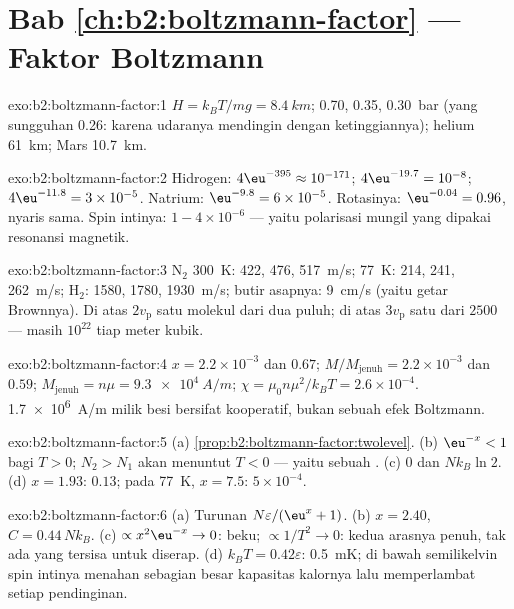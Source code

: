 \section*{Bab \ref{ch:b2:boltzmann-factor} --- Faktor Boltzmann}

\begin{solution}{exo:b2:boltzmann-factor:1}
$H = k_BT/mg = \qty{8.4}{km}$; \qty{0.70}{}, \qty{0.35}{}, \qty{0.30}{bar} (yang sungguhan
\qty{0.26}{}: karena udaranya mendingin dengan ketinggiannya); helium \qty{61}{km}; Mars
\qty{10.7}{km}.
\end{solution}

\begin{solution}{exo:b2:boltzmann-factor:2}
Hidrogen: $4\eu^{-395} \approx 10^{-171}$; $4\eu^{-19.7} = 10^{-8}$; $4\eu^{-11.8} = 3 \times
10^{-5}$. Natrium: $\eu^{-9.8} = 6 \times 10^{-5}$. Rotasinya: $\eu^{-0.04} = 0.96$, nyaris
sama. Spin intinya: $1 - 4 \times 10^{-6}$ --- yaitu polarisasi mungil yang
dipakai resonansi magnetik.
\end{solution}

\begin{solution}{exo:b2:boltzmann-factor:3}
N$_2$ \qty{300}{K}: \qty{422}{}, \qty{476}{}, \qty{517}{m/s}; \qty{77}{K}: \qty{214}{}, \qty{241}{},
\qty{262}{m/s}; H$_2$: \qty{1580}{}, \qty{1780}{}, \qty{1930}{m/s}; butir asapnya:
\qty{9}{cm/s} (yaitu getar Brownnya). Di atas $2v_{\text{p}}$ satu molekul dari
dua puluh; di atas $3v_{\text{p}}$ satu dari $2500$ --- masih $10^{22}$ tiap meter kubik.
\end{solution}

\begin{solution}{exo:b2:boltzmann-factor:4}
$x = 2.2 \times 10^{-3}$ dan $0.67$; $M/M_{\text{jenuh}} = 2.2 \times 10^{-3}$ dan $0.59$;
$M_{\text{jenuh}} = n\mu = \qty{9.3e4}{A/m}$; $\chi = \mu_0n\mu^2/k_BT = 2.6 \times 10^{-4}$.
\qty{1.7e6}{A/m} milik besi bersifat kooperatif, bukan sebuah efek Boltzmann.
\end{solution}

\begin{solution}{exo:b2:boltzmann-factor:5}
(a) \cref{prop:b2:boltzmann-factor:twolevel}. (b) $\eu^{-x} < 1$ bagi $T > 0$;
$N_2 > N_1$ akan menuntut $T < 0$ --- yaitu sebuah . (c) $0$ dan
$Nk_B\ln 2$. (d) $x = 1.93$: $0.13$; pada \qty{77}{K}, $x = 7.5$: $5 \times 10^{-4}$.
\end{solution}

\begin{solution}{exo:b2:boltzmann-factor:6}
(a) Turunan $N\varepsilon/(\eu^x + 1)$. (b) $x = 2.40$, $C = 0.44\,Nk_B$.
(c) $\propto x^2\eu^{-x} \to 0$: beku; $\propto 1/T^2 \to 0$: kedua arasnya penuh,
tak ada yang tersisa untuk diserap. (d) $k_BT = 0.42\varepsilon$: \qty{0.5}{mK}; di bawah
semilikelvin spin intinya menahan sebagian besar kapasitas kalornya lalu
memperlambat setiap pendinginan.
\end{solution}

